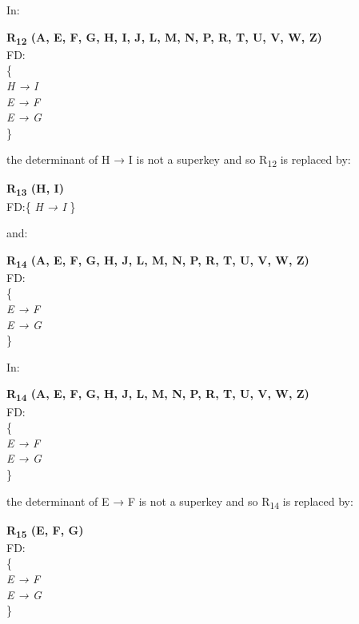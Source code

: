 In:\\

\begin{adjustwidth}{2cm}{}
\textbf{R\textsubscript{12} (A, E, F, G, H, I, J, L, M, N, P, R, T, U, V, W, Z)}\\
FD:\\
\{\\
\textit{ 
H → I\\
E → F\\
E → G\\
}
\} \\
\end{adjustwidth} 

the determinant of H → I is not a superkey and so R\textsubscript{12} is replaced by:

\begin{adjustwidth}{2cm}{}
\textbf{R\textsubscript{13} (H, I)}\\
FD:\{
\textit{ 
H → I 
}
\} \\
\end{adjustwidth} 

and:\\

\begin{adjustwidth}{2cm}{}
\textbf{R\textsubscript{14} (A, E, F, G, H, J, L, M, N, P, R, T, U, V, W, Z)}\\
FD:\\
\{\\
\textit{ 
E → F\\
E → G\\
}
\} \\
\end{adjustwidth} 

In:\\

\begin{adjustwidth}{2cm}{}
\textbf{R\textsubscript{14} (A, E, F, G, H, J, L, M, N, P, R, T, U, V, W, Z)}\\
FD:\\
\{\\
\textit{ 
E → F\\
E → G\\
}
\} \\
\end{adjustwidth} 

the determinant of E → F is not a superkey and so R\textsubscript{14} is replaced by:

\begin{adjustwidth}{2cm}{}
\textbf{R\textsubscript{15} (E, F, G)}\\
FD:\\
\{\\
\textit{ 
E → F\\
E → G\\
}
\} \\
\end{adjustwidth}

